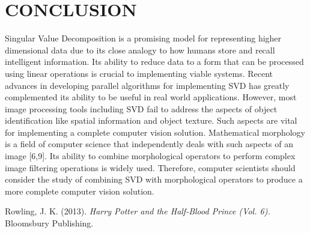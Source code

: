 \documentclass[12pt,a4paper]{article}
\begin{document}
    \section{\large CONCLUSION}
	\indent \par Singular Value Decomposition is a promising model for representing higher dimensional data due to its close analogy to how humans store and recall intelligent information. Its ability to reduce data to a form that can be processed using linear operations is crucial to implementing viable systems. Recent advances in developing parallel algorithms for implementing SVD has greatly complemented its ability to be useful in real world applications. However, most image processing tools including SVD fail to address the aspects of object identification like spatial information and object texture. Such aspects are vital for implementing a complete computer vision solution. Mathematical morphology is a field of computer science that independently deals with such aspects of an image [6,9]. Its ability to combine morphological operators to perform complex image filtering operations is widely used. Therefore, computer scientists should consider the study of combining SVD with morphological operators to produce a more complete computer vision solution.
	
	\begin{thebibliography}{9}
		
		Rowling, J. K. (2013). 
		\textit{Harry Potter and the Half-Blood Prince (Vol. 6). }
		Bloomsbury Publishing.
		
	\end{thebibliography}
	
\end{document}
